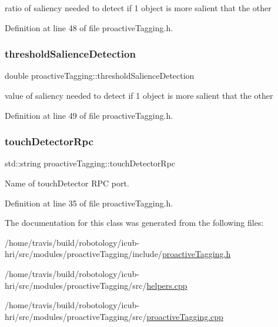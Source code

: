 ratio of saliency needed to detect if 1 object is more salient that the other 



Definition at line 48 of file proactive\+Tagging.\+h.

\mbox{\label{classproactiveTagging_a5e506aa6021526fb0665711593a5797c}} 
\subsubsection{\texorpdfstring{threshold\+Salience\+Detection}{thresholdSalienceDetection}}
{\footnotesize\ttfamily double proactive\+Tagging\+::threshold\+Salience\+Detection\hspace{0.3cm}{\ttfamily [protected]}}



value of saliency needed to detect if 1 object is more salient that the other 



Definition at line 49 of file proactive\+Tagging.\+h.

\mbox{\label{classproactiveTagging_aaaaed95ad0d6607683ab8451d6a90abf}} 
\subsubsection{\texorpdfstring{touch\+Detector\+Rpc}{touchDetectorRpc}}
{\footnotesize\ttfamily std\+::string proactive\+Tagging\+::touch\+Detector\+Rpc\hspace{0.3cm}{\ttfamily [protected]}}



Name of touch\+Detector R\+PC port. 



Definition at line 35 of file proactive\+Tagging.\+h.



The documentation for this class was generated from the following files\+:\begin{DoxyCompactItemize}
\item 
/home/travis/build/robotology/icub-\/hri/src/modules/proactive\+Tagging/include/\hyperlink{proactiveTagging_8h}{proactive\+Tagging.\+h}\item 
/home/travis/build/robotology/icub-\/hri/src/modules/proactive\+Tagging/src/\hyperlink{helpers_8cpp}{helpers.\+cpp}\item 
/home/travis/build/robotology/icub-\/hri/src/modules/proactive\+Tagging/src/\hyperlink{proactiveTagging_8cpp}{proactive\+Tagging.\+cpp}\end{DoxyCompactItemize}

